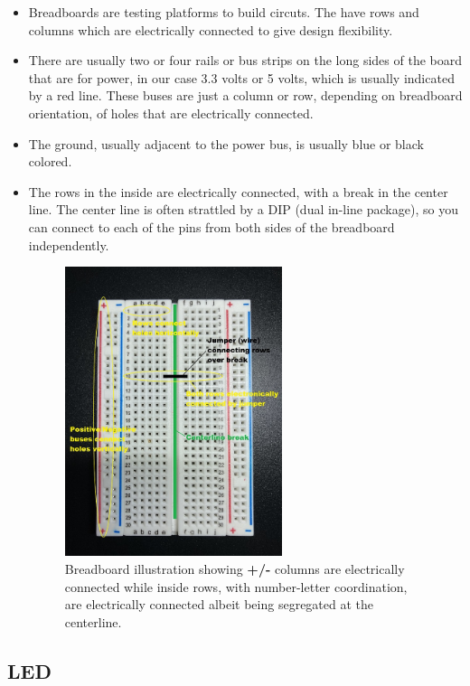 \documentclass{article}\usepackage[]{graphicx}\usepackage[]{color}
\begin{document}
\begin{itemize}
\item Breadboards are testing platforms to build circuts. The have rows and columns which are electrically connected to give design flexibility. 
\item There are usually two or four rails or bus strips on the long sides of the board that are for power, in our case 3.3 volts or 5 volts, which is usually indicated by a red line. These buses are just a column or row, depending on breadboard orientation, of holes that are electrically connected. 
\item The ground, usually adjacent to the power bus, is usually blue or black colored. 
\item The rows in the inside are electrically connected, with a break in the center line. The center line is often strattled by a DIP (dual in-line package), so you can connect to each of the pins from both sides of the breadboard independently. 
\begin{figure}[h]
\begin{center}
\includegraphics[width=0.60\textwidth]{bb2}
\caption{Breadboard illustration showing \textbf{+/-} columns are electrically connected while inside rows, with number-letter coordination, are electrically connected albeit being segregated at the centerline.\label{fig:bb2}}
\end{center}
\end{figure}
\end{itemize}

\subsection{LED}
\end{document}
